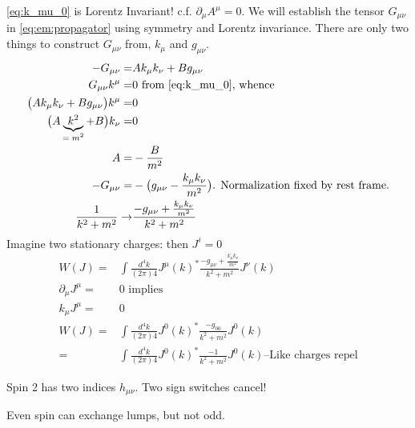 \documentclass[]{article}
\begin{document}
\eqref{eq:k_mu_0} is Lorentz Invariant! c.f. $\partial_{\mu}A^{\mu}=0$. We will establish the tensor $G_{\mu\nu}$ in \eqref{eq:em:propagator} using symmetry and Lorentz invariance. There are only two things to construct $G_{\mu\nu}$ from, $k_{\mu}$ and $g_{\mu\nu}$.
\begin{align*}
	- G_{\mu\nu} =& A k_{\mu} k_{\nu} + B g_{\mu\nu}\\
	 G_{\mu\nu} k^{\mu} =& 0 \text{ from \eqref{eq:k_mu_0}, whence}\\
	 \big(A k_{\mu} k_{\nu} + B g_{\mu\nu}\big) k^{\mu} =& 0\\
	 \big(A \underbrace{k^2}_\text{$=m^2$}+B\big)k_{\nu} =& 0\\
	 A =& -\frac{B}{m^2}\\
	 - G_{\mu\nu} =& -\big(g_{\mu\nu}-\frac{k_{\mu}k_{\nu}}{m^2}\big) \text{. Normalization fixed by rest frame.}\\
	 \frac{1}{k^2 + m^2} \rightarrow& \frac{-g_{\mu\nu}+\frac{k_{\mu}k_{\nu}}{m^2}}{k^2 + m^2}
\end{align*}
Imagine two stationary charges: then $J^i=0$
\begin{align*}
	W(J) =& \int  \frac{d^4k}{(2\pi)4} J^{\mu}(k)^* \frac{-g_{\mu\nu}+\frac{k_{\mu}k_{\nu}}{m^2}}{k^2 + m^2} J^{\nu}(k)\\
	\partial_{\mu} J^{\mu} =& 0 \text{ implies}\\
	k_{\mu} J^{\mu} =& 0\\
	W(J) =& \int  \frac{d^4k}{(2\pi)4} J^0(k)^* \frac{-g_{00}}{k^2 + m^2} J^0(k)\\
	=& \int  \frac{d^4k}{(2\pi)4} J^0(k)^* \frac{-1}{k^2 + m^2} J^0(k) \text{--Like charges repel}
\end{align*}

Spin 2 has two indices $h_{\mu\nu}$. Two sign switches cancel!

Even spin can exchange lumps, but not odd.
\end{document}
